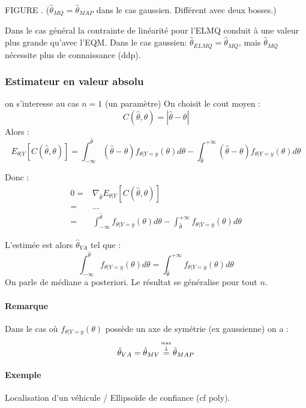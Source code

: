 \documentclass[main.tex]{subfiles}
\begin{document}
FIGURE . ($\hat{\theta}_{MQ}=\hat{\theta}_{MAP}$ dans le cas gaussien. Différent avec deux bosses.)


Dans le cas général la contrainte de linéarité pour l'ELMQ conduit à une valeur plus grande qu'avec l'EQM. Dans le cas gaussien: $\hat{\theta}_{ELMQ}=\hat{\theta}_{MQ}$, mais $\hat{\theta}_{MQ}$ nécessite plus de connaissance (ddp).

\subsubsection{Estimateur en valeur absolu}

\begin{defin}
  on s'interesse au cas $n=1$ (un paramètre)
  On choisit le cout moyen :
  \[
    C(\hat{\theta},\theta) = |\hat{\theta}-\theta|
  \]
  Alors :
  \[
    E_{\theta|Y}[C(\hat{\theta},\theta)] = \int_{-\infty}^{\hat{\theta}}(\hat{\theta}-\theta)f_{\theta|Y=y}(\theta)d\theta-\int_{\hat{\theta}}^{+\infty}(\hat{\theta}-\theta)f_{\theta|Y=y}(\theta)d\theta
  \]
\end{defin}

Donc :
\begin{align*}
  0 =&  \nabla_{\hat{\theta}}E_{\theta|Y}[C(\hat{\theta},\theta)] \\
     =& \dots \\
     =&\int_{-\infty}^{\hat{\theta}}f_{\theta|Y=y}(\theta)d\theta-\int_{\hat{\theta}}^{+\infty}f_{\theta|Y=y}(\theta)d\theta
\end{align*}

\begin{prop}
  L'estimée est alors $\hat{\theta}_{VA}$ tel que :
  \[
    \int_{-\infty}^{\hat{\theta}}f_{\theta|Y=y}(\theta)d\theta = \int_{\hat{\theta}}^{+\infty}f_{\theta|Y=y}(\theta)d\theta
  \]
  On parle de médiane a posteriori. Le résultat se généralise pour tout $n$.
\end{prop}

\paragraph{Remarque} Dans le cas où $f_{\theta|Y=y}(\theta)$ possède un axe de symétrie (ex gaussienne) on a :
\[
  \hat{\theta}_{VA} =\hat{\theta}_{MV} \operatorname*{=}^{\stackrel{\max}{\downarrow}} \hat{\theta}_{MAP}
\]

\paragraph{Exemple} Localisation d'un véhicule / Ellipsoïde de confiance (cf poly).
\end{document}
